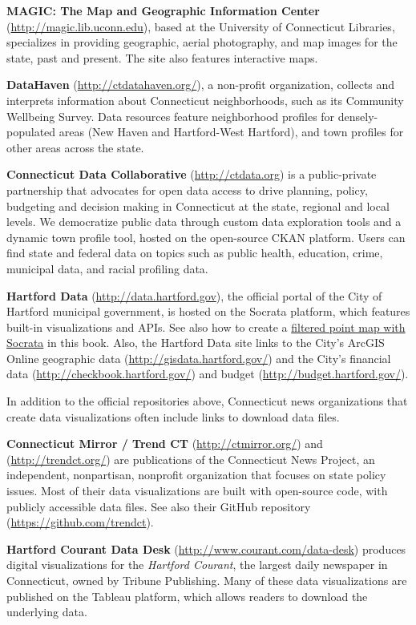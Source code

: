 \documentclass[
  english,
]{book}
\begin{document}
\textbf{MAGIC: The Map and Geographic Information Center} (\url{http://magic.lib.uconn.edu}), based at the University of Connecticut Libraries, specializes in providing geographic, aerial photography, and map images for the state, past and present. The site also features interactive maps.

\textbf{DataHaven} (\url{http://ctdatahaven.org/}), a non-profit organization, collects and interprets information about Connecticut neighborhoods, such as its Community Wellbeing Survey. Data resources feature neighborhood profiles for densely-populated areas (New Haven and Hartford-West Hartford), and town profiles for other areas across the state.

\textbf{Connecticut Data Collaborative} (\url{http://ctdata.org}) is a public-private partnership that advocates for open data access to drive planning, policy, budgeting and decision making in Connecticut at the state, regional and local levels. We democratize public data through custom data exploration tools and a dynamic town profile tool, hosted on the open-source CKAN platform. Users can find state and federal data on topics such as public health, education, crime, municipal data, and racial profiling data.

\textbf{Hartford Data} (\url{http://data.hartford.gov}), the official portal of the City of Hartford municipal government, is hosted on the Socrata platform, which features built-in visualizations and APIs. See also how to create a \href{filtered-point-map-socrata}{filtered point map with Socrata} in this book. Also, the Hartford Data site links to the City's ArcGIS Online geographic data (\url{http://gisdata.hartford.gov/}) and the City's financial data (\url{http://checkbook.hartford.gov/}) and budget (\url{http://budget.hartford.gov/}).

In addition to the official repositories above, Connecticut news organizations that create data visualizations often include links to download data files.

\textbf{Connecticut Mirror / Trend CT } (\url{http://ctmirror.org/}) and (\url{http://trendct.org/}) are publications of the Connecticut News Project, an independent, nonpartisan, nonprofit organization that focuses on state policy issues. Most of their data visualizations are built with open-source code, with publicly accessible data files. See also their GitHub repository (\url{https://github.com/trendct}).

\textbf{Hartford Courant Data Desk} (\url{http://www.courant.com/data-desk}) produces digital visualizations for the \emph{Hartford Courant}, the largest daily newspaper in Connecticut, owned by Tribune Publishing. Many of these data visualizations are published on the Tableau platform, which allows readers to download the underlying data.
\end{document}
